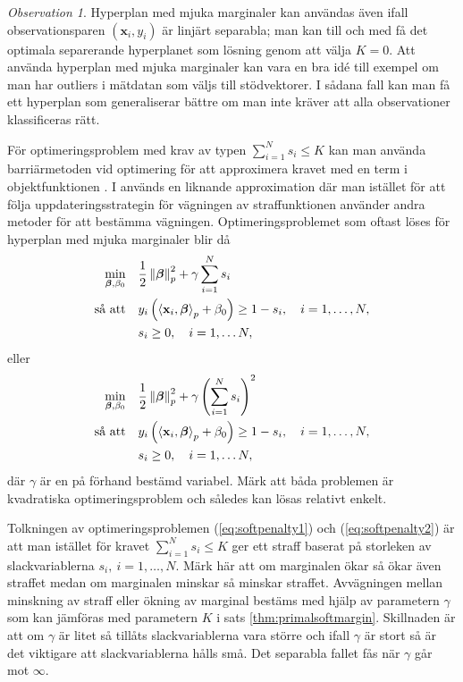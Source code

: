 \documentclass[a4paper, 12pt]{report}
\theoremstyle{definition}
\theoremstyle{remark}
\newtheorem*{rem}{Observation}
\newcommand{\bfbeta}{{\boldsymbol{\beta}}}
\newcommand{\bfx}{\mathbf{x}}
\newcommand{\llangle}{\left\langle}
\newcommand{\rrangle}{\right\rangle}
\newcommand{\inner}[2]{\llangle #1, #2 \rrangle}
\begin{document}
\begin{rem}
	Hyperplan med mjuka marginaler kan användas även ifall observationsparen $\left(\mathbf{x}_i,y_i\right)$ är linjärt separabla; man kan till och med få det optimala separerande hyperplanet som lösning genom att välja $K=0$. Att använda hyperplan med mjuka marginaler kan vara en bra idé till exempel om man har outliers i mätdatan som väljs till stödvektorer. I sådana fall kan man få ett hyperplan som generaliserar bättre om man inte kräver att alla observationer klassificeras rätt.
\end{rem}

För optimeringsproblem med krav av typen $\sum_{i=1}^{N}s_i\leq K$ kan man använda barriärmetoden vid optimering för att approximera kravet med en term i objektfunktionen \cite{Boyd}. I \cite{CortesVapnik} används en liknande approximation där man istället för att följa uppdateringsstrategin för vägningen av straffunktionen använder andra metoder för att bestämma vägningen. Optimeringsproblemet som oftast löses för hyperplan med mjuka marginaler blir då
\begin{equation}\label{eq:softpenalty1}
\begin{aligned}
	\operatornamewithlimits{min}_{\bfbeta,\beta_0} & & &\frac{1}{2}\left\|\bfbeta
\right\|_p^2 + \gamma\sum_{i=1}^{N} s_i\\
	\text{så att} & & &y_i\left(\inner{\bfx_i}{\bfbeta}_p+\beta_0\right)\geq 1 - s_i,\quad i=1,\dots,N,\\
	& & &s_i\geq0,\quad i=1,\dots N,
\end{aligned}
\end{equation}
eller
\begin{equation}\label{eq:softpenalty2}
\begin{aligned}
\operatornamewithlimits{min}_{\bfbeta,\beta_0} & & &\frac{1}{2}\left\|\bfbeta
\right\|_p^2 + \gamma\left(\sum_{i=1}^{N} s_i\right)^2\\
\text{så att} & & &y_i\left(\inner{\bfx_i}{\bfbeta}_p+\beta_0\right)\geq 1 - s_i,\quad i=1,\dots,N,\\
& & &s_i\geq0,\quad i=1,\dots N,
\end{aligned}
\end{equation}
där $\gamma$ är en på förhand bestämd variabel.
Märk att båda problemen är kvadratiska optimeringsproblem och således kan lösas relativt enkelt.

Tolkningen av optimeringsproblemen (\ref{eq:softpenalty1}) och (\ref{eq:softpenalty2}) är att man istället för kravet $\sum_{i=1}^{N}s_i\leq K$ ger ett straff baserat på storleken av slackvariablerna $s_i,~i=1,\dots,N$. Märk här att om marginalen ökar så ökar även straffet medan om marginalen minskar så minskar straffet. Avvägningen mellan minskning av straff eller ökning av marginal bestäms med hjälp av parametern $\gamma$ som kan jämföras med parametern $K$ i sats \ref{thm:primalsoftmargin}. Skillnaden är att om $\gamma$ är litet så tillåts slackvariablerna vara större och ifall $\gamma$ är stort så är det viktigare att slackvariablerna hålls små. Det separabla fallet fås när $\gamma$ går mot $\infty$.
\end{document}
